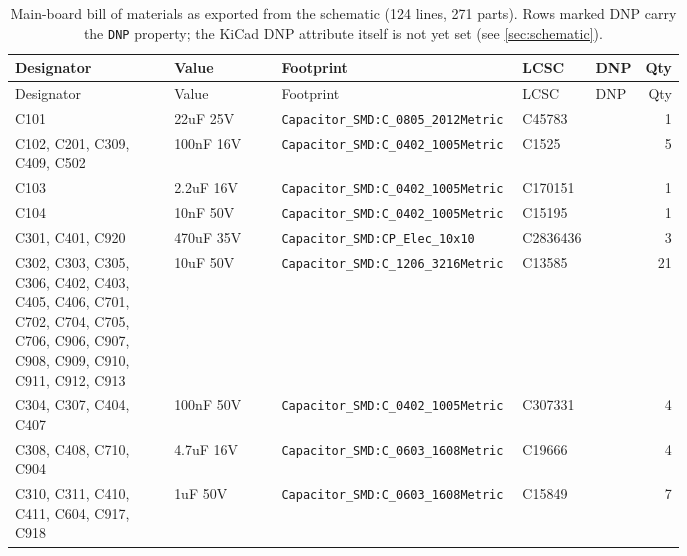 {\scriptsize
\setlength{\tabcolsep}{3pt}
\begin{longtable}{@{}>{\raggedright\arraybackslash}p{0.25\linewidth}>{\raggedright\arraybackslash}p{0.17\linewidth}>{\raggedright\arraybackslash}p{0.36\linewidth}l l r@{}}
\caption{Main-board bill of materials as exported from the schematic (124 lines, 271 parts). Rows marked DNP carry the \texttt{DNP} property; the KiCad DNP attribute itself is not yet set (see \cref{sec:schematic}).}\label{tab:bom}\\
\toprule Designator & Value & Footprint & LCSC & DNP & Qty\\ \midrule
\endfirsthead
\toprule Designator & Value & Footprint & LCSC & DNP & Qty\\ \midrule
\endhead
\bottomrule
\endlastfoot
C101 & 22uF 25V & \texttt{Capacitor\_\allowbreak{}SMD:\allowbreak{}C\_\allowbreak{}0805\_\allowbreak{}2012Metric} & C45783 &  & 1\\
C102, C201, C309, C409, C502 & 100nF 16V & \texttt{Capacitor\_\allowbreak{}SMD:\allowbreak{}C\_\allowbreak{}0402\_\allowbreak{}1005Metric} & C1525 &  & 5\\
C103 & 2.2uF 16V & \texttt{Capacitor\_\allowbreak{}SMD:\allowbreak{}C\_\allowbreak{}0402\_\allowbreak{}1005Metric} & C170151 &  & 1\\
C104 & 10nF 50V & \texttt{Capacitor\_\allowbreak{}SMD:\allowbreak{}C\_\allowbreak{}0402\_\allowbreak{}1005Metric} & C15195 &  & 1\\
C301, C401, C920 & 470uF 35V & \texttt{Capacitor\_\allowbreak{}SMD:\allowbreak{}CP\_\allowbreak{}Elec\_\allowbreak{}10x10} & C2836436 &  & 3\\
C302, C303, C305, C306, C402, C403, C405, C406, C701, C702, C704, C705, C706, C906, C907, C908, C909, C910, C911, C912, C913 & 10uF 50V & \texttt{Capacitor\_\allowbreak{}SMD:\allowbreak{}C\_\allowbreak{}1206\_\allowbreak{}3216Metric} & C13585 &  & 21\\
C304, C307, C404, C407 & 100nF 50V & \texttt{Capacitor\_\allowbreak{}SMD:\allowbreak{}C\_\allowbreak{}0402\_\allowbreak{}1005Metric} & C307331 &  & 4\\
C308, C408, C710, C904 & 4.7uF 16V & \texttt{Capacitor\_\allowbreak{}SMD:\allowbreak{}C\_\allowbreak{}0603\_\allowbreak{}1608Metric} & C19666 &  & 4\\
C310, C311, C410, C411, C604, C917, C918 & 1uF 50V & \texttt{Capacitor\_\allowbreak{}SMD:\allowbreak{}C\_\allowbreak{}0603\_\allowbreak{}1608Metric} & C15849 &  & 7\\

\end{longtable}}
